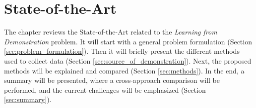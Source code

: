 \section{State-of-the-Art}
\label{sec:sota}
The chapter reviews the State-of-the-Art related to the \textit{Learning from Demonstration} problem. It will start with a general problem formulation (Section \ref{sec:problem_formulation}). Then it will briefly present the different methods used to collect data (Section \ref{sec:source_of_demonstration}). Next, the proposed methods will be explained and compared (Section \ref{sec:methods}). In the end, a summary will be presented, where a cross-approach comparison will be performed, and the current challenges will be emphasized (Section \ref{sec:summary}).



